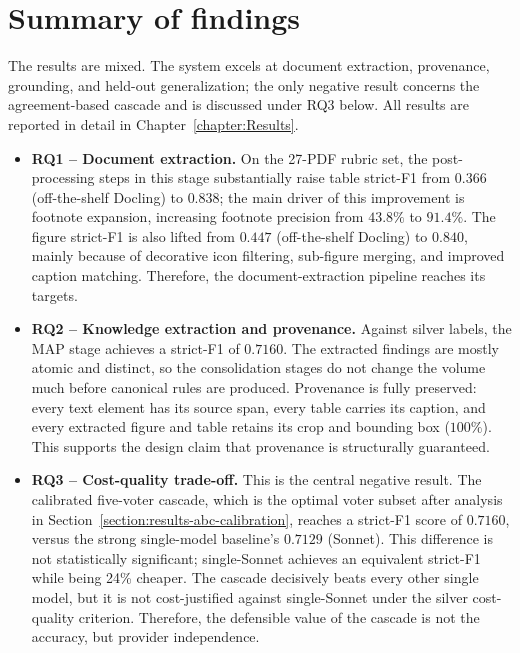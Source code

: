 \section{Summary of findings}\label{section:intro-summary-of-findings}

The results are mixed. The system excels at document extraction, provenance, grounding, and held-out generalization; the only negative result concerns the agreement-based cascade and is discussed under RQ3 below. All results are reported in detail in Chapter~\ref{chapter:Results}. 

\begin{itemize}[label={},leftmargin=1.5em]

    \item \textbf{RQ1 -- Document extraction.} On the 27-PDF rubric set, the post-processing steps in this stage substantially raise table strict-F1 from $0.366$ (off-the-shelf Docling) to $0.838$; the main driver of this improvement is footnote expansion, increasing footnote precision from $43.8\%$ to $91.4\%$. The figure strict-F1 is also lifted from $0.447$ (off-the-shelf Docling) to $0.840$, mainly because of decorative icon filtering, sub-figure merging, and improved caption matching. Therefore, the document-extraction pipeline reaches its targets.
    
    \item \textbf{RQ2 -- Knowledge extraction and provenance.} Against silver labels, the MAP stage achieves a strict-F1 of $0.7160$. The extracted findings are mostly atomic and distinct, so the consolidation stages do not change the volume much before canonical rules are produced. Provenance is fully preserved: every text element has its source span, every table carries its caption, and every extracted figure and table retains its crop and bounding box ($100\%$). This supports the design claim that provenance is structurally guaranteed.
    
    \item \textbf{RQ3 -- Cost-quality trade-off.} This is the central negative result. The calibrated five-voter cascade, which is the optimal voter subset after analysis in Section~\ref{section:results-abc-calibration}, reaches a strict-F1 score of $0.7160$, versus the strong single-model baseline's $0.7129$ (Sonnet). This difference is not statistically significant; single-Sonnet achieves an equivalent strict-F1 while being 24\% cheaper. The cascade decisively beats every other single model, but it is not cost-justified against single-Sonnet under the silver cost-quality criterion. Therefore, the defensible value of the cascade is not the accuracy, but provider independence.
    

\end{itemize}
